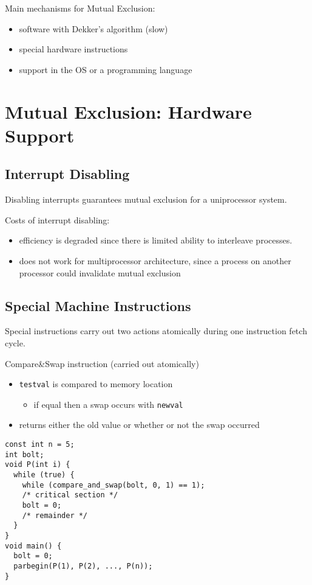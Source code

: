 \documentclass[11pt]{article}
\begin{document}
Main mechanisms for Mutual Exclusion:
\begin{itemize}
\item software with Dekker's algorithm (slow)
\item special hardware instructions
\item support in the OS or a programming language
\end{itemize}
\section{Mutual Exclusion: Hardware Support}
\label{sec:orgf504b74}
\subsection{Interrupt Disabling}
\label{sec:org6c76f34}
Disabling interrupts guarantees mutual exclusion for a uniprocessor
system.

Costs of interrupt disabling:
\begin{itemize}
\item efficiency is degraded since there is limited ability to
interleave processes.
\item does not work for multiprocessor architecture, since a process
on another processor could invalidate mutual exclusion
\end{itemize}
\subsection{Special Machine Instructions}
\label{sec:orgf3be3ef}
Special instructions carry out two actions atomically
during one instruction fetch cycle.

Compare\&Swap instruction (carried out atomically)
\begin{itemize}
\item \texttt{testval} is compared to memory location
\begin{itemize}
\item if equal then a swap occurs with \texttt{newval}
\end{itemize}
\item returns either the old value or whether or not the swap occurred
\end{itemize}

\begin{verbatim}
const int n = 5;
int bolt;
void P(int i) {
  while (true) {
    while (compare_and_swap(bolt, 0, 1) == 1);
    /* critical section */
    bolt = 0;
    /* remainder */
  }
}
void main() {
  bolt = 0;
  parbegin(P(1), P(2), ..., P(n));
}
\end{verbatim}
\end{document}
